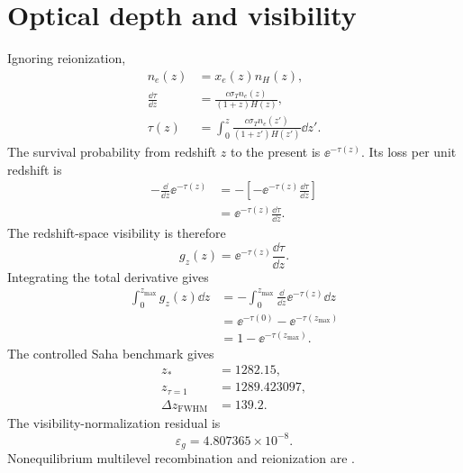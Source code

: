 \section{Optical depth and visibility}
Ignoring reionization,
\begin{align}
n_e(z)&=x_e(z)n_H(z),\\
\frac{\dd\tau}{\dd z}
&=
\frac{c\sigma_Tn_e(z)}{(1+z)H(z)},\\
\tau(z)&=\int_0^z
\frac{c\sigma_Tn_e(z')}{(1+z')H(z')}
\dd z'.
\end{align}
The survival probability from redshift \(z\) to the present is \(\ee^{-\tau(z)}\).  Its loss per unit redshift is
\begin{align}
-\frac{\dd}{\dd z}\ee^{-\tau(z)}
&=-\left[-\ee^{-\tau(z)}\frac{\dd\tau}{\dd z}\right]\\
&=\ee^{-\tau(z)}\frac{\dd\tau}{\dd z}.
\end{align}
The redshift-space visibility is therefore
\begin{equation}
\boxed{
g_z(z)=\ee^{-\tau(z)}\frac{\dd\tau}{\dd z}.
}
\end{equation}
Integrating the total derivative gives
\begin{align}
\int_0^{z_{\max}}g_z(z)\dd z
&=-\int_0^{z_{\max}}
\frac{\dd}{\dd z}\ee^{-\tau(z)}\dd z\\
&=\ee^{-\tau(0)}-\ee^{-\tau(z_{\max})}\\
&=1-\ee^{-\tau(z_{\max})}.
\end{align}
The controlled Saha benchmark gives
\begin{align}
z_*&=1282.15,\\
z_{\tau=1}&=1289.423097,\\
\Delta z_{\mathrm{FWHM}}&=139.2.
\end{align}
The visibility-normalization residual is
\begin{equation}
\varepsilon_g=4.807365\times10^{-8}.
\end{equation}
Nonequilibrium multilevel recombination and reionization are .

